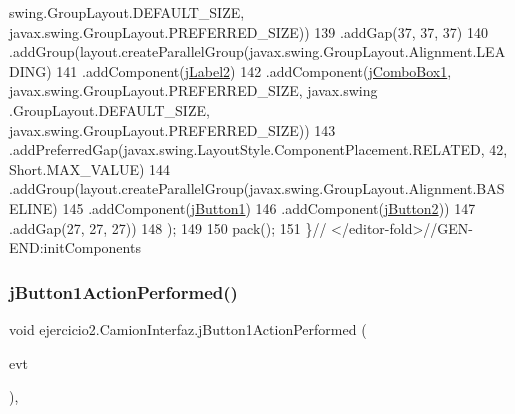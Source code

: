 \begin{DoxyCode}
      swing.GroupLayout.DEFAULT\_SIZE, javax.swing.GroupLayout.PREFERRED\_SIZE))
139                 .addGap(37, 37, 37)
140                 .addGroup(layout.createParallelGroup(javax.swing.GroupLayout.Alignment.LEADING)
141                     .addComponent(\mbox{\hyperlink{classejercicio2_1_1_camion_interfaz_a4a0e429b6f6d6aeb7911a2e89cfcf384}{jLabel2}})
142                     .addComponent(\mbox{\hyperlink{classejercicio2_1_1_camion_interfaz_ad99726150fad438267d353b48c6aaf7d}{jComboBox1}}, javax.swing.GroupLayout.PREFERRED\_SIZE, javax.swing
      .GroupLayout.DEFAULT\_SIZE, javax.swing.GroupLayout.PREFERRED\_SIZE))
143                 .addPreferredGap(javax.swing.LayoutStyle.ComponentPlacement.RELATED, 42, Short.MAX\_VALUE)
144                 .addGroup(layout.createParallelGroup(javax.swing.GroupLayout.Alignment.BASELINE)
145                     .addComponent(\mbox{\hyperlink{classejercicio2_1_1_camion_interfaz_a782e2170ce45db1bd1d32b61d1d7be8c}{jButton1}})
146                     .addComponent(\mbox{\hyperlink{classejercicio2_1_1_camion_interfaz_aa5f586a69f5266a210a12f6873d21657}{jButton2}}))
147                 .addGap(27, 27, 27))
148         );
149 
150         pack();
151     \}\textcolor{comment}{// </editor-fold>//GEN-END:initComponents}
\end{DoxyCode}
\mbox{\label{classejercicio2_1_1_camion_interfaz_a46d5fa816420dfcdd1f92e946a42bf24}} 
\subsubsection{\texorpdfstring{j\+Button1\+Action\+Performed()}{jButton1ActionPerformed()}}
{\footnotesize\ttfamily void ejercicio2.\+Camion\+Interfaz.\+j\+Button1\+Action\+Performed (\begin{DoxyParamCaption}\item[{java.\+awt.\+event.\+Action\+Event}]{evt }\end{DoxyParamCaption})\hspace{0.3cm}{\ttfamily [inline]}, {\ttfamily [private]}}


